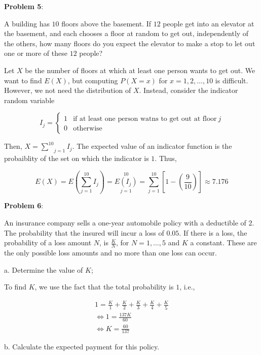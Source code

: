 \documentclass{article}
\begin{document}
\noindent\textbf{Problem 5}:

{\color{blue}

A building has $10$ floors above the basement. If $12$ people get into an elevator at the basement, and each chooses a floor at random to get out, independently of the others, how many floors do you expect the elevator to make a stop to let out one or more of these $12$ people?

Let $X$ be the number of floors at which at least one person wants to get out. We want to find $E(X)$, but computing $P(X=x)$ for $x=1,2,\ldots,10$ is difficult. However, we not need the distribution of $X$. Instead, consider the indicator random variable

\[I_j=\begin{cases}1&\text{if at least one person watns to get out at floor}\ j\\0&\text{otherwise}\end{cases}\]

Then, $X=\underset{j=1}{\overset{10}{\sum}}I_j$. The expected value of an indicator function is the probaiblity of the set on which the indicator is $1$. Thus,

\[E(X)=E(\underset{j=1}{\overset{10}{\sum}}I_j)=\underset{j=1}{\overset{10}{E(I_j)}}=\underset{j=1}{\overset{10}{\sum}}\left[1-\left(\frac{9}{10}\right)\right]\approx7.176\]

}

\noindent\textbf{Problem 6}:

An insurance company sells a one-year automobile policy with a deductible of $2$. The probability that the insured will incur a loss of $0.05$. If there is a loss, the probability of a loss amount $N$, is $\frac{K}{N}$, for $N=1,\ldots,5$ and $K$ a constant. These are the only possible loss amounts and no more than one loss can occur.

\indent\indent a. Determine the value of $K$;

{\color{blue}

To find $K$, we use the fact that the total probability is $1$, i.e.,

\begin{gather*}
    1=\frac{K}{1}+\frac{K}{2}+\frac{K}{3}+\frac{K}{4}+\frac{K}{5}\\
    \Leftrightarrow1=\frac{137K}{60}\\
    \Leftrightarrow K=\frac{60}{137}
\end{gather*}

}

\indent\indent b. Calculate the expected payment for this policy.
\end{document}
